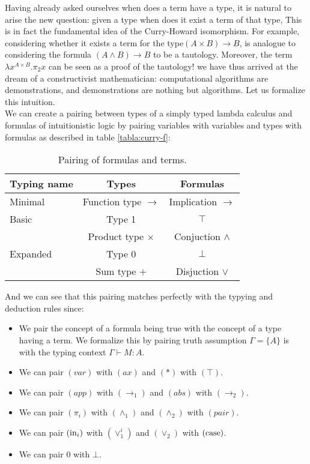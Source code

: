 Having already asked ourselves when does a term have a type, it is natural to arise the new question: given a type when does it exist a term of that type, This is in fact the fundamental idea of the Curry-Howard isomorphism. For example, considering whether it exists a term for the type$(A \times B) \to B$, is analogue to considering the formula $(A\land B)\to B$ to be a tautology. Moreover, the term $\lambda x^{A\times B}. \pi_2 x$ can be seen as a proof of the tautology! we have thus arrived at the dream of a constructivist mathematician: computational algorithms are demonstrations, and demonstrations are nothing but algorithms. Let us formalize this intuition.\\


We can create a pairing between types of a simply typed lambda calculus and formulas of intuitionistic logic  by pairing variables with variables and types with formulas as described in table \ref{tabla:curry-f}:
\begin{table}[!h]\label{tabla:curry-h}
  \begin{center}
    \begin{tabular}{|l|c|c|}
      \hline
      Typing name & Types  & Formulas  \\
      \hline
      Minimal     & Function type $\to$   & Implication $\to$  \\
      \hline 
      Basic      & Type 1 & $\top$ \\
                  & Product type $\times$ & Conjuction $\land$ \\
      \hline
      Expanded   & Type 0 & $\bot$ \\
                  & Sum type $+$     & Disjuction $\lor$ \\
      \hline
    \end{tabular}
    \caption*{\label{tab:table-name} Pairing of formulas and terms.}
  \end{center}
\end{table}

And we can see that this pairing matches perfectly with the typying and deduction rules since: 

\begin{itemize}
\item We pair the concept of a formula being true with the concept of a type having a term. We formalize this by pairing truth assumption $\Gamma=\{A\}$ is with the typing context $\Gamma\vdash M:A$. 
\item We can pair $(var)$ with $(ax)$ and $(*)$ with $(\top)$.
\item We can pair $(app)$ with $(\to_1)$ and $(abs)$ with $(\to_2)$.
\item We can pair $(\pi_i)$ with $(\land_1)$ and $(\land_2)$ with $(pair)$.
\item We can pair $(\operatorname{in}_i)$ with $(\lor_1^i)$ and $(\lor_2)$ with $(\operatorname{case})$.
\item We can pair $0$ with $\bot$.
\end{itemize}


